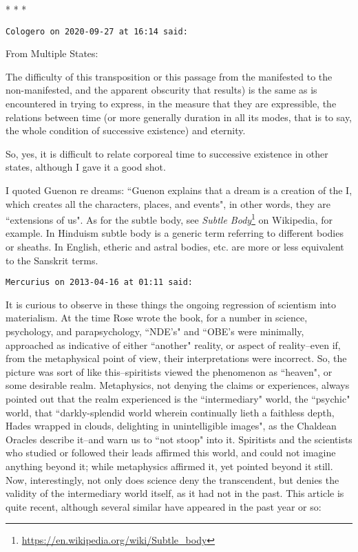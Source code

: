 
\begin{center}* * *\end{center}

\begin{footnotesize}\begin{sffamily}

\texttt{Cologero on 2020-09-27 at 16:14 said: }

From Multiple States:

\begin{quotex}
The difficulty of this transposition or this passage from the manifested to the non-manifested, and the apparent obscurity that results) is the same as is encountered in trying to express, in the measure that they are expressible, the relations between time (or more generally duration in all its modes, that is to say, the whole condition of successive existence) and eternity.

\end{quotex}
So, yes, it is difficult to relate corporeal time to successive existence in other states, although I gave it a good shot.

I quoted Guenon re dreams: ``Guenon explains that a dream is a creation of the I, which creates all the characters, places, and events", in other words, they are ``extensions of us". As for the subtle body, see \textit{Subtle Body}\footnote{\url{https://en.wikipedia.org/wiki/Subtle_body}} on Wikipedia, for example. In Hinduism subtle body is a generic term referring to different bodies or sheaths. In English, etheric and astral bodies, etc. are more or less equivalent to the Sanskrit terms.

\hfill

\texttt{Mercurius on 2013-04-16 at 01:11 said: }

It is curious to observe in these things the ongoing regression of scientism into materialism. At the time Rose wrote the book, for a number in science, psychology, and parapsychology, ``NDE's" and ``OBE's were minimally, approached as indicative of either ``another" reality, or aspect of reality–even if, from the metaphysical point of view, their interpretations were incorrect. So, the picture was sort of like this–spiritists viewed the phenomenon as ``heaven", or some desirable realm. Metaphysics, not denying the claims or experiences, always pointed out that the realm experienced is the ``intermediary" world, the ``psychic" world, that ``darkly-splendid world wherein continually lieth a faithless depth, Hades wrapped in clouds, delighting in unintelligible images", as the Chaldean Oracles describe it–and warn us to ``not stoop" into it. Spiritists and the scientists who studied or followed their leads affirmed this world, and could not imagine anything beyond it; while metaphysics affirmed it, yet pointed beyond it still. Now, interestingly, not only does science deny the transcendent, but denies the validity of the intermediary world itself, as it had not in the past. This article is quite recent, although several similar have appeared in the past year or so:


\end{sffamily}
\end{footnotesize}
